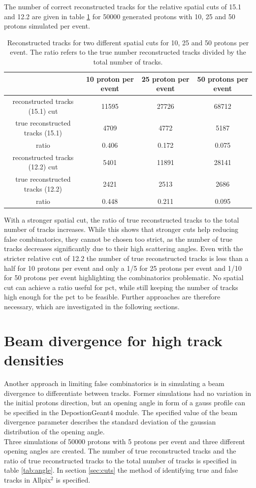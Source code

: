 The number of correct reconstructed tracks for the relative spatial cuts of 15.1 and 12.2 are given in table
\ref{tab:true_tracks} for 50000 generated protons with 10,
25 and 50 protons simulated per event.


\begin{table}
  \hspace{-1.5cm}
  \begin{tabular}{c | c c c}
    \toprule
     & 10 proton per event & 25 proton per event & 50 protons per event\\
    \midrule
    reconstructed tracks (15.1) cut & 11595 & 27726 & 68712  \\
    true reconstructed tracks (15.1) & 4709 & 4772  & 5187 \\
    ratio & 0.406 & 0.172 & 0.075 \\
    \midrule
    reconstructed tracks (12.2) cut & 5401 & 11891 & 28141 \\
    true reconstructed tracks (12.2) &  2421 &2513  & 2686 \\
    ratio & 0.448 & 0.211 & 0.095
  \end{tabular}
  \caption{Reconstructed tracks for two different spatial cuts for 10, 25 and 50 protons per event. The ratio refers to the true
  number reconstructed tracks divided by the total number of tracks.}
  \label{tab:true_tracks}
\end{table}

With a stronger spatial cut,  the ratio of true reconstructed tracks to
the total number of tracks increases. While this shows that stronger cuts help reducing false combinatorics, they cannot be chosen too strict,
as the number of true tracks decreases significantly due to their high scattering angles. Even with the stricter relative cut of 12.2 the
number of true reconstructed tracks is  less than a half for 10 protons per event and only a 1/5 for 25 protons per event and 1/10 for 50 protons per event highlighting
the combinatorics problematic. No spatial cut can achieve a ratio useful for pct, while still keeping the number
of tracks high enough for the pct to be feasible. Further approaches are therefore necessary, which are investigated in the following sections.

\section{Beam divergence for high track densities}
Another approach in limiting false combinatorics is in simulating a beam divergence to differentiate between tracks. Former simulations had no variation
in the initial protons direction, but an opening angle in form of a gauss profile can be specified in the DepostionGeant4 module. The specified value of
the beam divergence parameter describes the standard deviation of the gaussian distribution of the opening angle.  \\
Three simulations of 50000 protons with 5 protons per event and three different opening angles are created. The number of true reconstructed tracks and the ratio
of true reconstructed tracks to the total number of tracks is specified in table \ref{tab:angle}. In section \ref{sec:cuts} the method of identifying
true and false tracks in Allpix$^2$ is specified.

